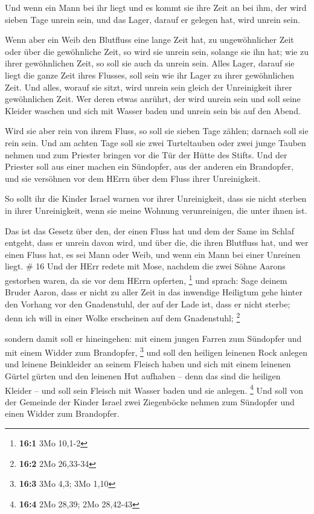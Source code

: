  Und wenn ein Mann bei ihr liegt und es kommt sie ihre Zeit
an bei ihm, der wird sieben Tage unrein sein, und das Lager, darauf er
gelegen hat, wird unrein sein.

 Wenn aber ein Weib den Blutfluss eine lange Zeit hat, zu
ungewöhnlicher Zeit oder über die gewöhnliche Zeit, so wird sie unrein
sein, solange sie ihn hat; wie zu ihrer gewöhnlichen Zeit, so soll sie
auch da unrein sein.  Alles Lager, darauf sie liegt die
ganze Zeit ihres Flusses, soll sein wie ihr Lager zu ihrer gewöhnlichen
Zeit. Und alles, worauf sie sitzt, wird unrein sein gleich der
Unreinigkeit ihrer gewöhnlichen Zeit.  Wer deren etwas
anrührt, der wird unrein sein und soll seine Kleider waschen und sich
mit Wasser baden und unrein sein bis auf den Abend.

 Wird sie aber rein von ihrem Fluss, so soll sie sieben
Tage zählen; darnach soll sie rein sein.  Und am achten
Tage soll sie zwei Turteltauben oder zwei junge Tauben nehmen und zum
Priester bringen vor die Tür der Hütte des Stifts.  Und der
Priester soll aus einer machen ein Sündopfer, aus der anderen ein
Brandopfer, und sie versöhnen vor dem HErrn über dem Fluss ihrer
Unreinigkeit.

 So sollt ihr die Kinder Israel warnen vor ihrer
Unreinigkeit, dass sie nicht sterben in ihrer Unreinigkeit, wenn sie
meine Wohnung verunreinigen, die unter ihnen ist.

 Das ist das Gesetz über den, der einen Fluss hat und dem
der Same im Schlaf entgeht, dass er unrein davon wird,  und
über die, die ihren Blutfluss hat, und wer einen Fluss hat, es sei Mann
oder Weib, und wenn ein Mann bei einer Unreinen liegt. \# 16
 Und der HErr redete mit Mose, nachdem die zwei Söhne Aarons
gestorben waren, da sie vor dem HErrn opferten, \footnote{\textbf{16:1}
  3Mo 10,1-2}  und sprach: Sage deinem Bruder Aaron, dass er
nicht zu aller Zeit in das inwendige Heiligtum gehe hinter den Vorhang
vor den Gnadenstuhl, der auf der Lade ist, dass er nicht sterbe; denn
ich will in einer Wolke erscheinen auf dem Gnadenstuhl; \footnote{\textbf{16:2}
  2Mo 26,33-34}

 sondern damit soll er hineingehen: mit einem jungen Farren
zum Sündopfer und mit einem Widder zum Brandopfer, \footnote{\textbf{16:3}
  3Mo 4,3; 3Mo 1,10}  und soll den heiligen leinenen Rock
anlegen und leinene Beinkleider an seinem Fleisch haben und sich mit
einem leinenen Gürtel gürten und den leinenen Hut aufhaben -- denn das
sind die heiligen Kleider -- und soll sein Fleisch mit Wasser baden und
sie anlegen. \footnote{\textbf{16:4} 2Mo 28,39; 2Mo 28,42-43}
 Und soll von der Gemeinde der Kinder Israel zwei
Ziegenböcke nehmen zum Sündopfer und einen Widder zum Brandopfer.

